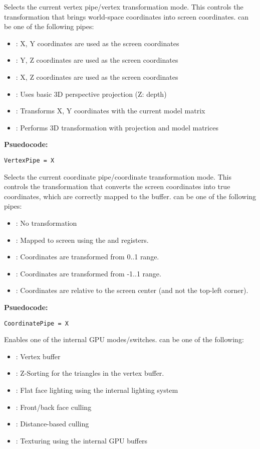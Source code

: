 Selects the current vertex pipe/vertex transformation mode. This controls the transformation that brings world-space coordinates into screen coordinates.  can be one of the following pipes:
\begin{itemize}
	\item {}: X, Y coordinates are used as the screen coordinates
	\item {}: Y, Z coordinates are used as the screen coordinates
	\item {}: X, Z coordinates are used as the screen coordinates
	\item {}: Uses basic 3D perspective projection (Z: depth)
	\item {}: Transforms X, Y coordinates with the current model matrix
	\item {}: Performs 3D transformation with projection and model matrices
\end{itemize}

\textbf{Psuedocode:}
\begin{verbatim}
VertexPipe = X
\end{verbatim}


Selects the current coordinate pipe/coordinate transformation mode. This controls the transformation that converts the screen coordinates into true coordinates, which are correctly mapped to the buffer.  can be one of the following pipes:
\begin{itemize}
	\item {}: No transformation
	\item {}: Mapped to screen using the  and  registers.
	\item {}: Coordinates are transformed from 0..1 range.
	\item {}: Coordinates are transformed from -1..1 range.
	\item {}: Coordinates are relative to the screen center (and not the top-left corner).
\end{itemize}

\textbf{Psuedocode:}
\begin{verbatim}
CoordinatePipe = X
\end{verbatim}


Enables one of the internal GPU modes/switches.  can be one of the following:
\begin{itemize}
  \item {}: Vertex buffer
	\item {}: Z-Sorting for the triangles in the vertex buffer.
	\item {}: Flat face lighting using the internal lighting system
	\item {}: Front/back face culling
	\item {}: Distance-based culling
	\item {}: Texturing using the internal GPU buffers
\end{itemize}

